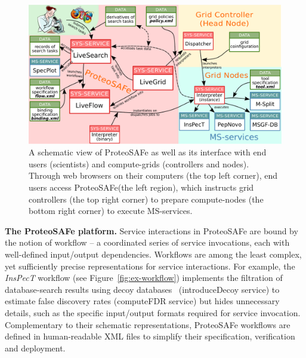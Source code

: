 \documentclass[arial,11pt]{article}
\newcommand{\SF}[1]{\textsf{#1}}
\newcommand{\SYSTEM}[0]{\SF{ProteoSAFe}\xspace}
\begin{document}
\begin{figure}[htb]
  \centering
  \includegraphics[width=\textwidth]{figures/arch.pdf}
  \caption{\footnotesize A schematic view of \SYSTEM as well as its interface with end users (scientists) and compute-grids (controllers and nodes).
    Through web browsers on their computers (the top left corner), end users access \SYSTEM (the left region),
      which instructs grid controllers (the top right corner) to prepare compute-nodes (the bottom right corner) to execute MS-services.}
  \label{fig:arch}
\end{figure}



{\bf The ProteoSAFe platform.} Service interactions in \SYSTEM are bound by the notion of workflow -- a coordinated series of service invocations, each with well-defined input/output dependencies. Workflows are among the least complex, yet sufficiently precise representations for service interactions. For example, the {\em  InsPecT} workflow (see Figure~\ref{fig:ex-workflow}) implements the filtration of database-search results using decoy databases~\cite{Elias:2007} (\SF{introduceDecoy} service) to estimate false discovery rates (\SF{computeFDR} service) but hides unnecessary details, such as the specific input/output formats required for service invocation.
Complementary to their schematic representations, \SYSTEM workflows are defined in human-readable XML files to simplify their specification, verification and deployment.
\end{document}

